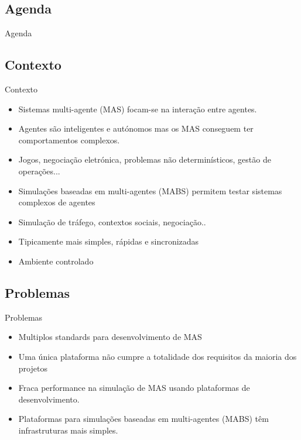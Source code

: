 
\subsection{Agenda}
\begin{frame}{Agenda}
	\setcounter{tocdepth}{1}
	\tableofcontents
\end{frame}

\subsection{Contexto}
\begin{frame}{Contexto}
	\begin{itemize}
		\item Sistemas multi-agente (MAS) focam-se na interação entre agentes.
		\item Agentes são inteligentes e autónomos mas os MAS conseguem ter comportamentos complexos.
		\item Jogos, negociação eletrónica, problemas não determinísticos, gestão de operações...
		\vspace{1cm}
		\item Simulações baseadas em multi-agentes (MABS) permitem testar sistemas complexos de agentes
		\item Simulação de tráfego, contextos sociais, negociação..
		\item Tipicamente mais simples, rápidas e sincronizadas
		\item Ambiente controlado
	\end{itemize}
\end{frame}

\subsection{Problemas}
\begin{frame}{Problemas}
	\begin{itemize}
		\item Multiplos standards para desenvolvimento de MAS
		\item Uma única plataforma não cumpre a totalidade dos requisitos da maioria dos projetos
		\item Fraca performance na simulação de MAS usando plataformas de desenvolvimento.
		\item Plataformas para simulações baseadas em multi-agentes (MABS) têm infrastruturas mais simples.
	\end{itemize}
\end{frame}

